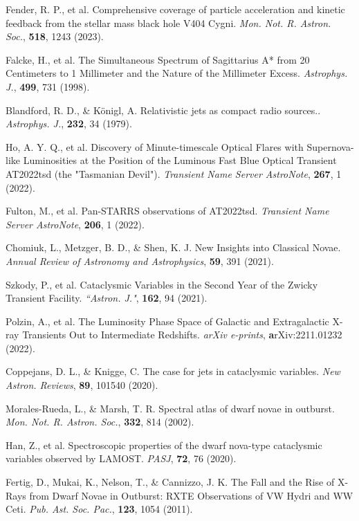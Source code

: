 \documentclass{nature_plusfigure}
\newcommand{\mn}{{Mon. Not. R. Astron. Soc.}}
\newcommand{\nar}{{New Astron. Reviews}}
\newcommand{\mnras}{\mn}
\newcommand{\aj}{{``Astron. J."}}
\newcommand{\apj}{{Astrophys. J.}}
\newcommand{\pasj}{{PASJ}}
\newcommand{\pasp}{{Pub. Ast. Soc. Pac.}}
\newcommand{\araa}{Annual Review of Astronomy and Astrophysics}
\begin{document}
\begin{methods}
\begin{thebibliography}{10}
  Fender, R. P., et al. Comprehensive coverage of particle acceleration and kinetic feedback from the stellar mass black hole V404 Cygni. \emph{\mnras}, \textbf{518}, 1243 (2023). 
 
  Falcke, H., et al. The Simultaneous Spectrum of Sagittarius A* from 20 Centimeters to 1 Millimeter and the Nature of the Millimeter Excess. \emph{\apj}, \textbf{499}, 731 (1998). 

  Blandford, R. D., \& Königl, A. Relativistic jets as compact radio sources.. \emph{\apj}, \textbf{232}, 34 (1979). 


 Ho, A. Y. Q., et al. Discovery of Minute-timescale Optical Flares with Supernova-like Luminosities at the Position of the Luminous Fast Blue Optical Transient AT2022tsd (the "Tasmanian Devil"). \emph{Transient Name Server AstroNote}, \textbf{267}, 1 (2022). 

 Fulton, M., et al. Pan-STARRS observations of AT2022tsd. \emph{Transient Name Server AstroNote}, \textbf{206}, 1 (2022). 

 Chomiuk, L., Metzger, B. D., \& Shen, K. J. New Insights into Classical Novae. \emph{\araa}, \textbf{59}, 391 (2021). 

 Szkody, P., et al. Cataclysmic Variables in the Second Year of the Zwicky Transient Facility. \emph{\aj}, \textbf{162}, 94 (2021). 

 Polzin, A., et al. The Luminosity Phase Space of Galactic and Extragalactic X-ray Transients Out to Intermediate Redshifts. \emph{arXiv e-prints}, \textbf arXiv:2211.01232 (2022). 

 Coppejans, D. L., \& Knigge, C. The case for jets in cataclysmic variables. \emph{\nar}, \textbf{89}, 101540 (2020). 

 Morales-Rueda, L., \& Marsh, T. R. Spectral atlas of dwarf novae in outburst. \emph{\mnras}, \textbf{332}, 814 (2002). 

 Han, Z., et al. Spectroscopic properties of the dwarf nova-type cataclysmic variables observed by LAMOST. \emph{\pasj}, \textbf{72}, 76 (2020). 

 Fertig, D., Mukai, K., Nelson, T., \& Cannizzo, J. K. The Fall and the Rise of X-Rays from Dwarf Novae in Outburst: RXTE Observations of VW Hydri and WW Ceti. \emph{\pasp}, \textbf{123}, 1054 (2011). 


\end{thebibliography}
\end{methods}
\end{document}
